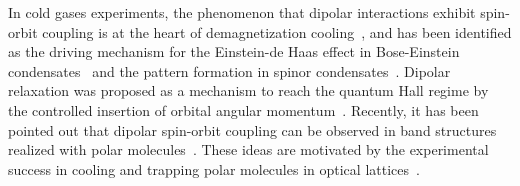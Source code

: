 In cold gases experiments, the phenomenon that dipolar interactions exhibit spin-orbit coupling is at the heart of demagnetization cooling~\cite{Hensler2003,Fattori2006},
and has been identified as the driving mechanism for the Einstein-de Haas effect in Bose-Einstein condensates~\cite{Kawaguchi2006} and the pattern formation in spinor condensates~\cite{Santos2006,Vengalattore2008,Kurn2013}.
Dipolar relaxation was proposed as a mechanism to reach the quantum Hall regime by the controlled insertion of orbital angular momentum~\cite{Peter2013}.
Recently, it has been pointed out that dipolar spin-orbit coupling can be observed in band structures realized with polar molecules~\cite{Syzranov2014}.
These ideas are motivated by the experimental success in cooling and trapping polar molecules in optical lattices~\cite{Ni2008b,Yan2013}.




